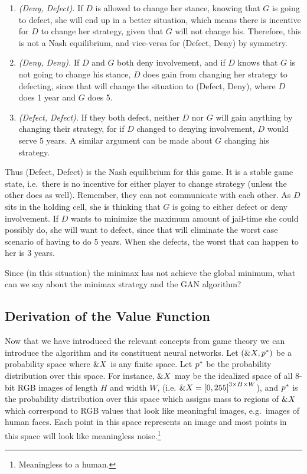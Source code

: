 \begin{enumerate}
  \item \textit{(Deny, Defect).} If $D$ is allowed to change her stance,
    knowing that $G$ is going to defect, she will end up in a better
    situation, which means there is incentive for $D$ to change her
    strategy, given that $G$ will not change his. Therefore, this is not
    a Nash equilibrium, and vice-versa for (Defect, Deny) by symmetry.
  \item \textit{(Deny, Deny).} If $D$ and $G$ both deny involvement, and
    if $D$ knows that $G$ is not going to change his stance, $D$ does
    gain from changing her strategy to defecting, since that will change
    the situation to (Defect, Deny), where $D$ does 1 year and $G$ does
    5.
  \item \textit{(Defect, Defect).} If they both defect, neither $D$ nor $G$ will gain
    anything by changing their strategy, for if $D$ changed to denying involvement,
    $D$ would serve 5 years. A similar argument can be made about $G$ changing his strategy.
\end{enumerate}

Thus (Defect, Defect) is the Nash equilibrium for this game. It is a stable game
state, i.e.\ there is no incentive for either player to change strategy (unless
the other does as well). Remember, they can not communicate with each other. As
$D$ sits in the holding cell, she is thinking that $G$ is going to either defect
or deny involvement. If $D$ wants to minimize the maximum amount of jail-time
she could possibly do, she will want to defect, since that will eliminate the
worst case scenario of having to do 5 years. When she defects, the worst that
can happen to her is 3 years.

Since (in this situation) the minimax has not achieve the global minimum, what
can we say about the minimax strategy and the GAN algorithm?

\subsection{Derivation of the Value Function}%
\label{sec:derivation}

Now that we have introduced the relevant concepts from game theory we can
introduce the algorithm and its constituent neural networks. Let $(\&X,
p^*)$ be a probability space where $\&X$ is any finite space. Let $p^*$ be
the probability distribution over this space. For instance, $\&X$ may be the
idealized space of all 8-bit RGB images of length $H$ and width $W$, (i.e.
$\&X = {[0, 255]}^{3 \times H \times W}$), and $p^*$ is the probability
distribution over this space which assigns mass to regions of $\&X$ which
correspond to RGB values that look like meaningful images, e.g.\ images of human
faces. Each point in this space represents an image and most points in this
space will look like meaningless noise.\footnote{Meaningless to a human.}


